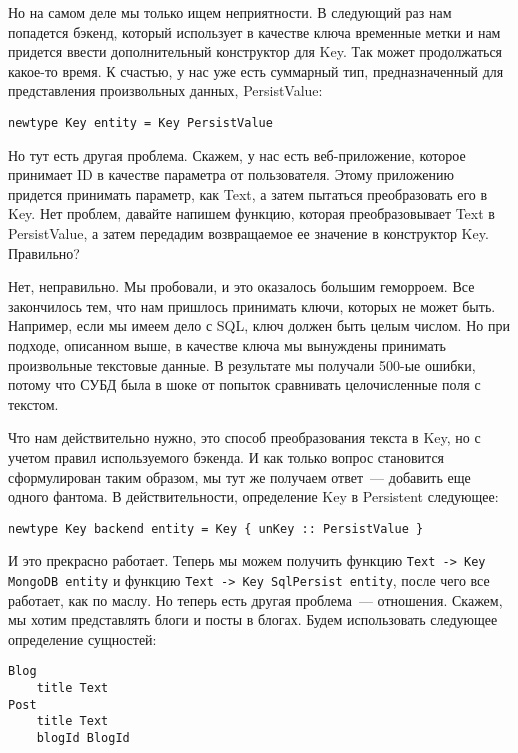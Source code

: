 Но на самом деле мы только ищем неприятности. В следующий раз нам попадется бэкенд, который использует в качестве ключа временные метки и нам придется ввести дополнительный конструктор для Key. Так может продолжаться какое-то время. К счастью, у нас уже есть суммарный тип, предназначенный для представления произвольных данных, PersistValue:

\begin{lstlisting}
newtype Key entity = Key PersistValue
\end{lstlisting}

Но тут есть другая проблема. Скажем, у нас есть веб-приложение, которое принимает ID в качестве параметра от пользователя. Этому приложению придется принимать параметр, как Text, а затем пытаться преобразовать его в Key. Нет проблем, давайте напишем функцию, которая преобразовывает Text в PersistValue, а затем передадим возвращаемое ее значение в конструктор Key. Правильно?

Нет, неправильно. Мы пробовали, и это оказалось большим геморроем. Все закончилось тем, что нам пришлось принимать ключи, которых не может быть. Например, если мы имеем дело с SQL, ключ должен быть целым числом. Но при подходе, описанном выше, в качестве ключа мы вынуждены принимать произвольные текстовые данные. В результате мы получали 500-ые ошибки, потому что СУБД была в шоке от попыток сравнивать целочисленные поля с текстом.

Что нам действительно нужно, это способ преобразования текста в Key, но с учетом правил используемого бэкенда. И как только вопрос становится сформулирован таким образом, мы тут же получаем ответ~--- добавить еще одного фантома. В действительности, определение Key в Persistent следующее:

\begin{lstlisting}
newtype Key backend entity = Key { unKey :: PersistValue }
\end{lstlisting}

И это прекрасно работает. Теперь мы можем получить функцию \lstinline'Text -> Key MongoDB entity' и функцию \lstinline'Text -> Key SqlPersist entity', после чего все работает, как по маслу. Но теперь есть другая проблема~--- отношения. Скажем, мы хотим представлять блоги и посты в блогах. Будем использовать следующее определение сущностей:

\begin{lstlisting}
Blog
    title Text
Post
    title Text
    blogId BlogId
\end{lstlisting}

